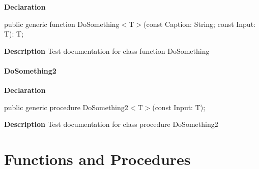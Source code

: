 \documentclass{report}
\begin{document}
\begin{list}{}{
\setlength{\itemindent}{0cm}
\setlength{\listparindent}{0cm}
\setlength{\leftmargin}{\evensidemargin}
\addtolength{\leftmargin}{\tmplength}
\settowidth{\labelsep}{X}
\addtolength{\leftmargin}{\labelsep}
\setlength{\labelwidth}{\tmplength}
}
\begin{flushleft}
\item[\textbf{Declaration}\hfill]
\begin{ttfamily}
public generic function DoSomething{$<$}T{$>$}(const Caption: String; const Input: T): T;\end{ttfamily}


\end{flushleft}
\par
\item[\textbf{Description}]
Test documentation for class function DoSomething

\end{list}
\paragraph*{DoSomething2}\hspace*{\fill}

\begin{list}{}{
\setlength{\itemindent}{0cm}
\setlength{\listparindent}{0cm}
\setlength{\leftmargin}{\evensidemargin}
\addtolength{\leftmargin}{\tmplength}
\settowidth{\labelsep}{X}
\addtolength{\leftmargin}{\labelsep}
\setlength{\labelwidth}{\tmplength}
}
\begin{flushleft}
\item[\textbf{Declaration}\hfill]
\begin{ttfamily}
public generic procedure DoSomething2{$<$}T{$>$}(const Input: T);\end{ttfamily}


\end{flushleft}
\par
\item[\textbf{Description}]
Test documentation for class procedure DoSomething2

\end{list}
\section{Functions and Procedures}
\end{document}
